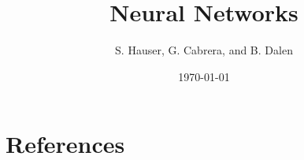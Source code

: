 \documentclass[twoside,twocolumn,10pt]{revtex4-1}
\begin{document}
	
	\title{Neural Networks}
	\author{S. Hauser, G. Cabrera, and B. Dalen}
	\date{\today}
	
	
	\renewcommand{\sectionmark}[1]{\markright{\MakeUppercase{\roman{section}}.\ #1}}
	\renewcommand{\chaptermark}[1]{\markboth{#1}{}}
	
	
	\fancyhf{} 
	\fancyhead[L]{\rightmark}
	\fancyfoot[C]{\thepage}
	
	
	
	\maketitle
	\twocolumngrid
	
	\def\doubleunderline#1{\underline{\underline{#1}}}
	
	
	
	
	
	
	
	
	
	
	
	
	
	\newpage
	
	
	\onecolumngrid
	\section*{References}
	
	
	\newpage 
	\twocolumngrid
	
	
	
\end{document}

